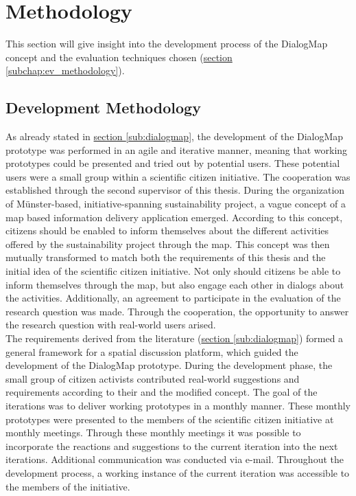 \section{Methodology}
\label{chap:methodology}
This section will give insight into the development process of the DialogMap concept and the evaluation techniques chosen (\hyperref[subchap:ev_methodology]{section \ref{subchap:ev_methodology}}).

\subsection{Development Methodology}
As already stated in \hyperref[sub:dialogmap]{section \ref{sub:dialogmap}}, the development of the DialogMap prototype was performed in an agile and iterative manner, meaning that working prototypes could be presented and tried out by potential users. These potential users were a small group within a scientific citizen initiative. The cooperation was established through the second supervisor of this thesis. During the organization of Münster-based, initiative-spanning sustainability project, a vague concept of a map based information delivery application emerged. According to this concept, citizens should be enabled to inform themselves about the different activities offered by the sustainability project through the map. This concept was then mutually transformed to match both the requirements of this thesis and the initial idea of the scientific citizen initiative. Not only should citizens be able to inform themselves through the map, but also engage each other in dialogs about the activities. Additionally, an agreement to participate in the evaluation of the research question was made. Through the cooperation, the opportunity to answer the research question with real-world users arised.\\
The requirements derived from the literature (\hyperref[sub:dialogmap]{section \ref{sub:dialogmap}}) formed a general framework for a spatial discussion platform, which guided the development of the DialogMap prototype. During the development phase, the small group of citizen activists contributed real-world suggestions and requirements according to their and the modified concept. The goal of the iterations was to deliver working prototypes in a monthly manner. These monthly prototypes were presented to the members of the scientific citizen initiative at monthly meetings. Through these monthly meetings it was possible to incorporate the reactions and suggestions to the current iteration into the next iterations. Additional communication was conducted via e-mail. Throughout the development process, a working instance of the current iteration was accessible to the members of the initiative.\\

